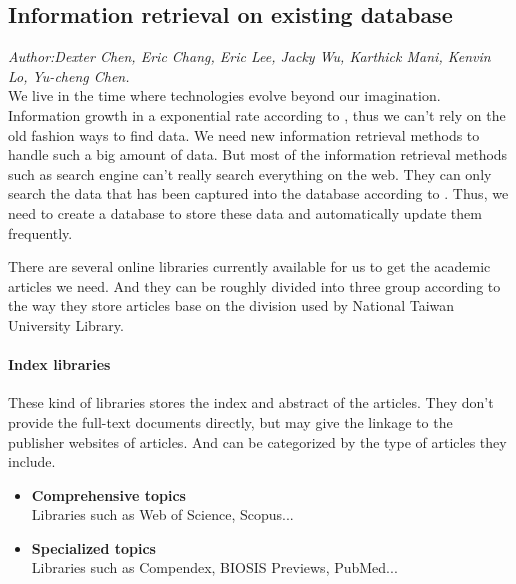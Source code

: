 	
\subsection{Information retrieval on existing database}
\textit{\footnotesize Author:Dexter Chen, Eric Chang, Eric Lee, Jacky Wu, Karthick Mani, Kenvin Lo, Yu-cheng Chen.}\\

We live in the time where technologies evolve beyond our imagination.
Information growth in a exponential rate according to \cite{Tague1981}, thus we can't rely on the old fashion ways to find data. 
We need new information retrieval methods to handle such a big amount of data.
But most of the information retrieval methods such as search engine can't really search everything on the web. 
They can only search the data that has been captured into the database according to \cite{Grehan2002}. 
Thus, we need to create a database to store these data and automatically update them frequently.

There are several online libraries currently available for us to get the academic articles we need.
And they can be roughly divided into three group according to the way they store articles base on the division used by National Taiwan University Library.

\paragraph{Index libraries}

	These kind of libraries stores the index and abstract of the articles.
	They don't provide the full-text documents directly, but may give the linkage to the publisher websites of articles.
	And can be categorized by the type of articles they include.
	
	\begin{itemize}
		
		\item\textbf{Comprehensive topics}\\Libraries such as Web of Science, Scopus...
		\item\textbf{Specialized topics}\\Libraries such as Compendex, BIOSIS Previews, PubMed...
		
	\end{itemize}
	
